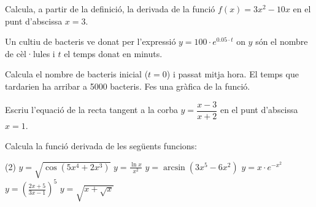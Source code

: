 \begin{mylist}
	\exer[2] Calcula, a partir de la definició, la derivada de la funció $f(x)=3x^2 -10x$ en el punt d'abscissa $x=3$. 
	
	\exer[2] Un cultiu de bacteris ve donat per l'expressió $y=100 \cdot e^{0.05\cdot t}$ on $y$ són el nombre de cèl·lules i $t$ el temps donat en minuts. 
	\begin{tasks}
		\task Calcula el nombre de bacteris inicial ($t=0$) i passat mitja hora.
		\task El temps que tardarien ha arribar a 5000 bacteris.
		\task Fes una gràfica de la funció.
	\end{tasks} 
	
	\exer[2] Escriu l'equació de la recta tangent a la corba $y=\dfrac{x-3}{x+2}$ en el punt d'abscissa \linebreak $x=1$.
	\answers{$y=-\frac{2}{3}+\frac{5}{9}(x-1)$ o $y=\frac{5x}{9}-\frac{11}{9}$.}
	
	\exer[2] Calcula la funció derivada de les següents funcions:
	\begin{tasks}(2)
		\task $y=\sqrt{\cos (5x^4+2x^3)}$
		\task $y=\frac{\ln x}{x^2}$
		\task $y=\arcsin (3x^5 - 6 x^2)$
		\task $y=x\cdot e^{-x^2}$
		\task $y=\left(\frac{2x+5}{3x-1}\right)^5$
		\task $y=\sqrt{x+\sqrt{x}}$
	\end{tasks}
	

\end{mylist}
